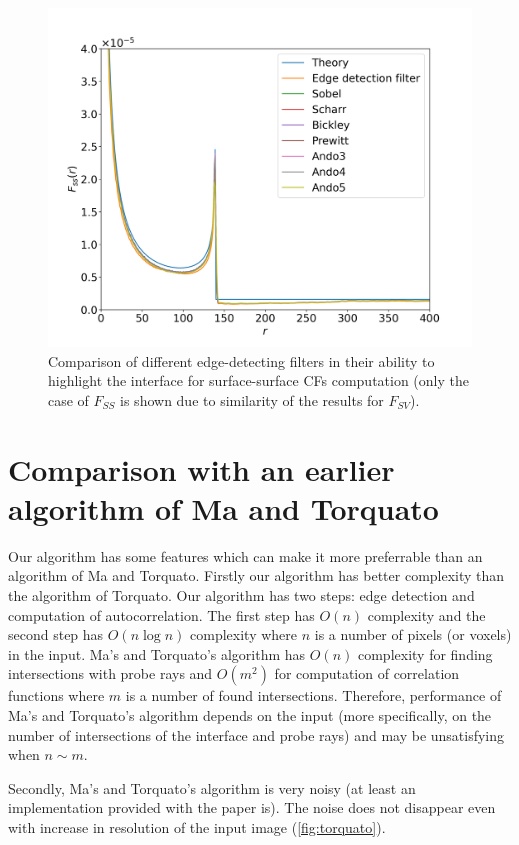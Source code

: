 \documentclass[reprint,amsmath,amssymb,aps,pre,showkeys,showpacs]{revtex4-1}
\begin{document}
\begin{figure}[ht]
  \centering \includegraphics[width=\linewidth]{images/kernels.png}
  \caption{Comparison of different edge-detecting filters in their ability to
    highlight the interface for surface-surface CFs computation (only the case
    of $F_{SS}$ is shown due to similarity of the results for
    $F_{SV}$).}
  \label{fig:kernels}
\end{figure}

\section{Comparison with an earlier algorithm of Ma and Torquato}
\label{sec:comparison-ma}
Our algorithm has some features which can make it more preferrable than an
algorithm of Ma and Torquato\cite{ma2018SS}. Firstly our algorithm has better
complexity than the algorithm of Torquato. Our algorithm has two steps: edge
detection and computation of autocorrelation. The first step has $O(n)$
complexity and the second step has $O(n \log n)$ complexity where $n$ is a
number of pixels (or voxels) in the input. Ma's and Torquato's algorithm has
$O(n)$ complexity for finding intersections with probe rays and $O(m^2)$ for
computation of correlation functions where $m$ is a number of found
intersections. Therefore, performance of Ma's and Torquato's algorithm depends
on the input (more specifically, on the number of intersections of the interface
and probe rays) and may be unsatisfying when $n \sim m$.

Secondly, Ma's and Torquato's algorithm is very noisy (at least an
implementation provided with the paper is). The noise does not disappear even
with increase in resolution of the input image (\cref{fig:torquato}).
\end{document}
